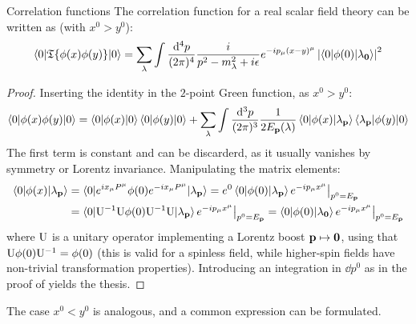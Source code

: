 \begin{proposition}{Correlation functions}{}
  The correlation function for a real scalar field theory can be written as (with $ x^0 > y^0 $):
  \begin{equation}
    \braket{0 | \mathfrak{T}\{\phi(x) \phi(y)\} | 0} = \sum_\lambda \int \frac{\mathrm{d}^4p}{(2\pi)^4} \frac{i}{p^2 - m_\lambda^2 + i\epsilon} e^{-i p_\mu (x - y)^\mu} \left\lvert\braket{0 | \phi(0) | \lambda_{\mathbf{0}}}\right\rvert^2
  \end{equation}
\end{proposition}

\begin{proofbox}
  \begin{proof}
    Inserting the identity in the $ 2 $-point Green function, as $ x^0 > y^0 $:
    \begin{equation*}
      \braket{0 | \phi(x) \phi(y) | 0} = \braket{0 | \phi(x) | 0} \braket{0 | \phi(y) | 0} +  \sum_\lambda \int \frac{\mathrm{d}^3p}{(2\pi)^3} \frac{1}{2E_{\mathbf{p}}(\lambda)} \braket{0 | \phi(x) | \lambda_{\mathbf{p}}} \braket{\lambda_{\mathbf{p}} | \phi(y) | 0}
    \end{equation*}
    The first term is constant and can be discarderd, as it usually vanishes by symmetry or Lorentz invariance. Manipulating the matrix elements:
    \begin{equation*}
      \begin{split}
        \braket{0 | \phi(x) | \lambda_{\mathbf{p}}}
        & = \braket{0 | e^{i x_\mu P^\mu} \phi(0) e^{-i x_\mu P^\mu} | \lambda_{\mathbf{p}}} = e^0 \braket{0 | \phi(0) | \lambda_{\mathbf{p}}} e^{-i p_\mu x^\mu} \big\vert_{p^0 = E_{\mathbf{p}}} \\
        & = \braket{0 | \mathrm{U}^{-1} \mathrm{U} \phi(0) \mathrm{U}^{-1} \mathrm{U} | \lambda_{\mathbf{p}}} e^{-i p_\mu x^\mu} \big\vert_{p^0 = E_{\mathbf{p}}} = \braket{0 | \phi(0) | \lambda_{\mathbf{0}}} e^{-i p_\mu x^\mu} \big\vert_{p^0 = E_{\mathbf{p}}}
      \end{split}
    \end{equation*}
    where $ \mathrm{U} $ is a unitary operator implementing a Lorentz boost $ \mathbf{p} \mapsto \mathbf{0} $, using that $ \mathrm{U} \phi(0) \mathrm{U}^{-1} = \phi(0) $ (this is valid for a spinless field, while higher-spin fields have non-trivial transformation properties). Introducing an integration in $ \dd p^0 $ as in the proof of  yields the thesis.
  \end{proof}
\end{proofbox}

The case $ x^0 < y^0 $ is analogous, and a common expression can be formulated.

